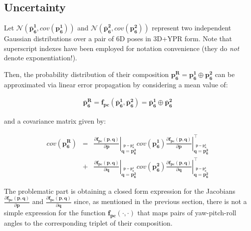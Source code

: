 \documentclass[a4paper,11pt]{report}
\begin{document}
\subsection{Uncertainty}

Let $\mathcal{N}(\mathbf{\bar{p}_6^1}, cov(\mathbf{p_6^1}))$ and
$\mathcal{N}(\mathbf{\bar{p}_6^2}, cov(\mathbf{p_6^2}))$ represent
two independent Gaussian distributions over a pair of 6D
poses in 3D+YPR form.
Note that superscript indexes have been employed
for notation convenience (they do \emph{not} denote exponentiation!).

Then, the probability distribution of their composition
$\mathbf{p_6^R} = \mathbf{p_6^1} \oplus \mathbf{p_6^2}$
can be approximated via linear error propagation by considering
a mean value of:

\begin{eqnarray}
\mathbf{\bar{p}_6^R}
= \mathbf{f_{pc}}(\mathbf{\bar{p}_6^1}, \mathbf{\bar{p}_6^2})
= \mathbf{\bar{p}_6^1} \oplus \mathbf{\bar{p}_6^2}
\end{eqnarray}

\noindent and a covariance matrix given by:

\begin{eqnarray}
cov(\mathbf{p_6^R}) &=&
\left. \frac{\partial \mathbf{f_{pc}}(\mathbf{p},\mathbf{q}) }{\partial \mathbf{p}} \right|_{\overset{ \mathbf{p}=\mathbf{p_6^1} }{ \mathbf{q}=\mathbf{p_6^2} }}
cov(\mathbf{p_6^1})
\left. \frac{\partial \mathbf{f_{pc}}(\mathbf{p},\mathbf{q}) }{\partial \mathbf{p}} \right|_{\overset{ \mathbf{p}=\mathbf{p_6^1} }{ \mathbf{q}=\mathbf{p_6^2} }}^\top
\nonumber \\ &+&
\left. \frac{\partial \mathbf{f_{pc}}(\mathbf{p},\mathbf{q}) }{\partial \mathbf{q}} \right|_{\overset{ \mathbf{p}=\mathbf{p_6^1} }{ \mathbf{q}=\mathbf{p_6^2} }}
cov(\mathbf{p_6^2})
\left. \frac{\partial \mathbf{f_{pc}}(\mathbf{p},\mathbf{q}) }{\partial \mathbf{q}} \right|_{\overset{ \mathbf{p}=\mathbf{p_6^1} }{ \mathbf{q}=\mathbf{p_6^2} }}^\top
\end{eqnarray}

The problematic part is obtaining a closed form expression for the
Jacobians
$\frac{\partial \mathbf{f_{pc}}(\mathbf{p},\mathbf{q}) }{\partial \mathbf{p}}$
and
$\frac{\partial \mathbf{f_{pc}}(\mathbf{p},\mathbf{q}) }{\partial \mathbf{q}}$
since, as mentioned in the previous section, there is not a simple expression
for the function $\mathbf{f_{pc}}(\cdot,\cdot)$ that maps pairs of yaw-pitch-roll angles
to the corresponding triplet of their composition.
\end{document}
